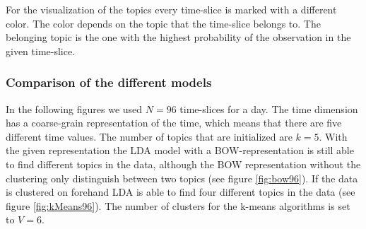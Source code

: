 For the visualization of the topics every time-slice is marked with a different color. The color depends on the topic that the time-slice belongs to. The belonging topic is the one with the highest probability of the observation in the given time-slice.



\subsubsection{Comparison of the different models}
In the following figures we used $N=96$ time-slices for a day. The time dimension has a coarse-grain representation of the time, which means that there are five different time values. The number of topics that are initialized are $k=5$.
With the given representation the LDA model with a BOW-representation is still able to find different topics in the data, although the BOW representation without the clustering only distinguish between two topics (see figure \ref{fig:bow96}). If the data is clustered on forehand LDA is able to find four different topics in the data (see figure \ref{fig:kMeans96}). The number of clusters for the k-means algorithms is set to $V=6$.

